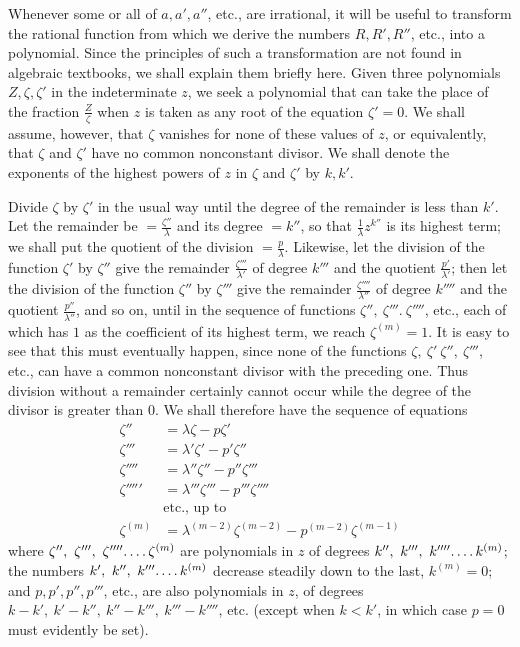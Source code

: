 Whenever some or all of $a, a', a''$, etc., are irrational, it will be useful to transform the rational function from which we derive the numbers $R, R', R''$, etc., into a polynomial. Since the principles of such a transformation are not found in algebraic textbooks, we shall explain them briefly here. Given three polynomials $Z,\zeta,\zeta'$ in the indeterminate $z$, we seek a polynomial that can take the place of the fraction $\frac Z\zeta$ when $z$ is taken as any root of the equation $\zeta'=0$. We shall assume, however, that $\zeta$ vanishes for none of these values of $z$, or equivalently, that $\zeta$ and $\zeta'$ have no common nonconstant divisor. We shall denote the exponents of the highest powers of $z$ in $\zeta$ and $\zeta'$ by $k,k'$.

Divide $\zeta$ by $\zeta'$ in the usual way until the degree of the remainder is less than $k'$. Let the remainder be $=\frac{\zeta''}{\lambda}$ and its degree $=k''$, so that $\frac1\lambda z^{k''}$ is its highest term; we shall put the quotient of the division $=\frac p\lambda$. Likewise, let the division of the function $\zeta'$ by $\zeta''$ give the remainder $\frac{\zeta'''}{\lambda'}$ of degree $k'''$ and the quotient $\frac{p'}{\lambda'}$; then let the division of the function $\zeta''$ by $\zeta'''$ give the remainder $\frac{\zeta''''}{\lambda''}$ of degree $k''''$ and the quotient $\frac{p''}{\lambda''}$, and so on, until in the sequence of functions $\zeta'',\ \zeta'''.\ \zeta''''$, etc., each of which has $1$ as the coefficient of its highest term, we reach $\zeta^{(m)}=1$. It is easy to see that this must eventually happen, since none of the functions $\zeta,\ \zeta'\ \zeta'',\ \zeta'''$, etc., can have a common nonconstant divisor with the preceding one. Thus division without a remainder certainly cannot occur while the degree of the divisor is greater than $0$. We shall therefore have the sequence of equations
\[
\begin{aligned}
\zeta''&=\lambda\zeta-p\zeta'\\
\zeta'''&=\lambda'\zeta'-p'\zeta''\\
\zeta''''&=\lambda''\zeta''-p''\zeta'''\\
\zeta'''''&=\lambda'''\zeta'''-p'''\zeta''''\\
&\text{etc., up to}\\
\zeta^{(m)}&=\lambda^{(m-2)}\zeta^{(m-2)}-p^{(m-2)}\zeta^{(m-1)}
\end{aligned}
\]
where $\zeta'',\allowbreak \ \zeta''',\allowbreak \ \zeta''''\ldotp\ldotp\ldotp\ldotp\zeta^{(m)}$ are polynomials in $z$ of degrees $k'',\allowbreak \ k''',\allowbreak \ k''''\allowbreak\ldotp\ldotp\ldotp\ldotp k^{(m)}$; the numbers $k',\allowbreak \ k'',\allowbreak \ k'''\ldotp\ldotp\ldotp\ldotp k^{(m)}$ decrease steadily down to the last, $k^{(m)}=0$; and $p,\allowbreak p',\allowbreak p'',\allowbreak p'''$, etc., are also polynomials in $z$, of degrees $k-k',\allowbreak \ k'-k'',\allowbreak \ k''-k''',\allowbreak \ k'''-k''''$, etc. (except when $k<k'$, in which case $p=0$ must evidently be set).

